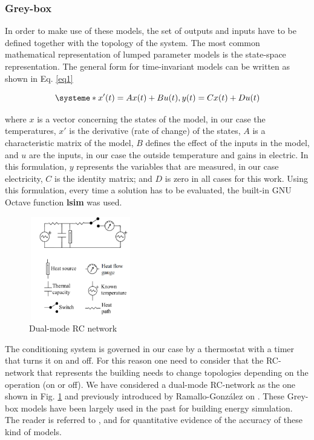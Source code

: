 \documentclass[10pt, conference, compsocconf]{IEEEtran}
\begin{document}
\subsubsection{ Grey-box}


In order to make use of these models, the set of outputs and inputs have to be defined together with the topology of the system. 
The most common mathematical representation of lumped parameter models is the state-space representation. The general form for time-invariant models can be written as shown in Eq. \ref{eq1}

\begin{equation}\label{eq1}
\systeme*{x'(t)=Ax(t) + Bu(t), y(t)= Cx(t) + Du(t)}
\end{equation}

where $x$ is a vector concerning the states of the model, in our case the temperatures, $x'$ is the derivative (rate of change) of the states, $A$ is a characteristic matrix of the model, $B$ defines the effect of the inputs in the model, and $u$ are the inputs, in our case the outside temperature and gains in electric. In this formulation, $y$ represents the variables that are measured, in our case electricity, $C$ is the identity matrix; and $D$ is zero in all cases for this work. Using this formulation, every time a solution has to be evaluated, the built-in GNU Octave function \textbf{lsim} was used.

\begin{figure}[h]%
\centering
\centerline{\includegraphics[width=4.5cm,height=4.5cm,keepaspectratio]{./pics/figAlf.pdf}}
\caption{Dual-mode RC network}\vspace*{-6pt}
  \label{fig:alf}
\end{figure}

The conditioning system is governed in our case by a thermostat with a timer that turns it on and off. For this reason one need to consider that the RC-network that represents the building needs to change topologies depending on the operation (on or off). We have considered a dual-mode RC-network as the one shown in Fig. \ref{fig:alf} and previously introduced by Ramallo-Gonz\'alez on \cite{ramalloidentifying}. 
These Grey-box models have been largely used in the past for building energy simulation. The reader is referred to \cite{bacher2011identifying}, \cite{coley1992second} and \cite{ramalloidentifying} for quantitative evidence of the accuracy of these kind of models.
\end{document}
